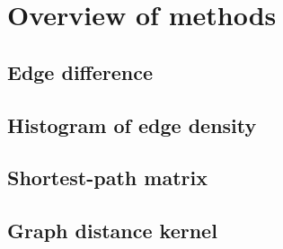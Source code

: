 \section{Overview of methods}
\label{sec:gc:methods}

\subsection{Edge difference}

\subsection{Histogram of edge density}

\subsection{Shortest-path matrix}

\subsection{Graph distance kernel}